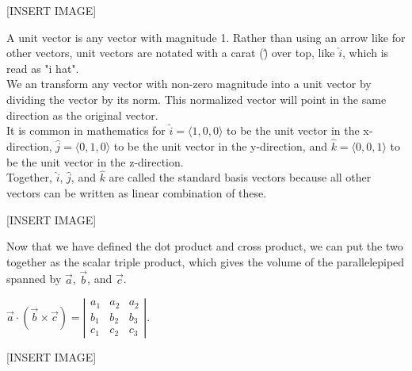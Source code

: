[INSERT IMAGE]

\noindent
A unit vector is any vector with magnitude 1. Rather than using an arrow like for other vectors, unit vectors are notated with a carat (\^) over top, like $\hat{i}$, which is read as "i hat".\\
We an transform any vector with non-zero magnitude into a unit vector by dividing the vector by its norm. This normalized vector will point in the same direction as the original vector.\\

\noindent
It is common in mathematics for $\hat{i}=\langle 1,0,0 \rangle$ to be the unit vector in the x-direction, $\hat{j}=\langle 0,1,0 \rangle$ to be the unit vector in the y-direction, and $\hat{k}=\langle 0,0,1 \rangle$ to be the unit vector in the z-direction.\\
Together, $\hat{i}$, $\hat{j}$, and $\hat{k}$ are called the standard basis vectors because all other vectors can be written as linear combination of these.

[INSERT IMAGE]




\noindent
Now that we have defined the dot product and cross product, we can put the two together as the scalar triple product, which gives the volume of the parallelepiped spanned by $\vec{a}$, $\vec{b}$, and $\vec{c}$.\\
\begin{center}
	$\vec{a}\cdot\left(\vec{b}\times\vec{c}\right)=\left|\begin{matrix}a_1 & a_2 & a_2\\b_1 & b_2 & b_3 \\ c_1 & c_2 & c_3\end{matrix}\right|$.
\end{center}

[INSERT IMAGE]
